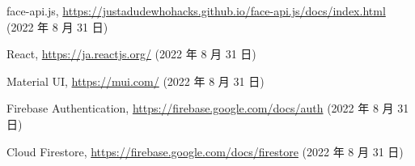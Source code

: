 \documentclass[12pt]{ltjsreport}%
\begin{document}
\begin{thebibliography}{99}
face-api.js,
\url{https://justadudewhohacks.github.io/face-api.js/docs/index.html} (2022 年 8 月 31 日)

React,
\url{https://ja.reactjs.org/} (2022 年 8 月 31 日)

Material UI,
\url{https://mui.com/} (2022 年 8 月 31 日)

Firebase Authentication,
\url{https://firebase.google.com/docs/auth} (2022 年 8 月 31 日)

Cloud Firestore,
\url{https://firebase.google.com/docs/firestore} (2022 年 8 月 31 日)

\end{thebibliography}
\end{document}
